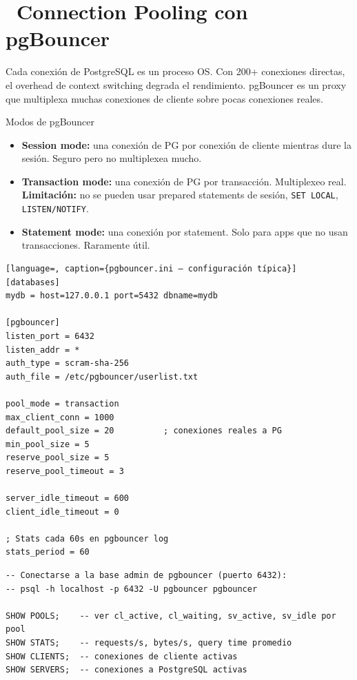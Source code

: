 \section[Connection Pooling con pgBouncer]{~Connection Pooling con pgBouncer}

Cada conexión de PostgreSQL es un proceso OS. Con 200+ conexiones directas, el overhead de context switching degrada el rendimiento. pgBouncer es un proxy que multiplexa muchas conexiones de cliente sobre pocas conexiones reales.

\begin{teoriabox}{Modos de pgBouncer}
\begin{itemize}
  \item \textbf{Session mode:} una conexión de PG por conexión de cliente mientras dure la sesión. Seguro pero no multiplexea mucho.
  \item \textbf{Transaction mode:} una conexión de PG por transacción. Multiplexeo real. \textbf{Limitación:} no se pueden usar prepared statements de sesión, \texttt{SET LOCAL}, \texttt{LISTEN/NOTIFY}.
  \item \textbf{Statement mode:} una conexión por statement. Solo para apps que no usan transacciones. Raramente útil.
\end{itemize}
\end{teoriabox}

\begin{lstlisting}[language=, caption={pgbouncer.ini — configuración típica}]
[databases]
mydb = host=127.0.0.1 port=5432 dbname=mydb

[pgbouncer]
listen_port = 6432
listen_addr = *
auth_type = scram-sha-256
auth_file = /etc/pgbouncer/userlist.txt

pool_mode = transaction
max_client_conn = 1000
default_pool_size = 20          ; conexiones reales a PG
min_pool_size = 5
reserve_pool_size = 5
reserve_pool_timeout = 3

server_idle_timeout = 600
client_idle_timeout = 0

; Stats cada 60s en pgbouncer log
stats_period = 60
\end{lstlisting}

\begin{lstlisting}[caption={Monitorear pgBouncer desde psql}]
-- Conectarse a la base admin de pgbouncer (puerto 6432):
-- psql -h localhost -p 6432 -U pgbouncer pgbouncer

SHOW POOLS;    -- ver cl_active, cl_waiting, sv_active, sv_idle por pool
SHOW STATS;    -- requests/s, bytes/s, query time promedio
SHOW CLIENTS;  -- conexiones de cliente activas
SHOW SERVERS;  -- conexiones a PostgreSQL activas
\end{lstlisting}

